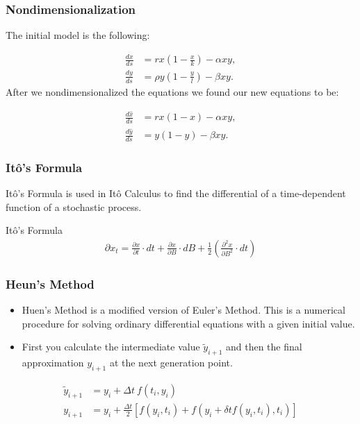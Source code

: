

\begin{frame}
\frametitle{Nondimensionalization}

The initial model is the following:

  \begin{align*}
    \frac{dx}{ds} & = rx \left(1-\frac{x}{k}\right) - \alpha xy, \\
    \frac{dy}{ds} & = \rho y \left(1-\frac{y}{l}\right) - \beta xy.
  \end{align*}
After we nondimensionalized the equations we found our new equations to be:

	\begin{align*}
		\frac{d\hat{x}}{ds} &= rx(1-x) - \alpha xy, \\
		\frac{d\hat{y}}{ds} &= y(1-y) - \beta xy.
	\end{align*}
\end{frame}



\begin{frame}
\frametitle{It\^o's Formula}
It\^o's Formula is used in It\^o Calculus to find the differential of a time-dependent function of a stochastic process.

		 \begin{block}{It\^o's Formula}
      \begin{align*}
				\partial x_t = \frac{\partial x}{\partial t} \cdot dt + \frac{\partial x}{\partial B} \cdot dB + \frac{1}{2} \left(\frac{\partial ^2 x}{\partial B ^2} \cdot dt\right)
			\end{align*}
    \end{block}
		
\end{frame}

\begin{frame}
\frametitle{Heun's Method}
\begin{itemize}
\item Huen's Method is a modified version of Euler's Method. This is a numerical procedure for solving ordinary differential equations with a given initial value.
\item First you calculate the intermediate value $\tilde{y}_{i+1}$ and then the final approximation $y_{i+1}$ at the next generation point.
\end{itemize}

\begin{align*}
	\tilde{y}_{i+1} &= y_i + \Delta t \ f(t_i, y_i) \\
	y_{i+1} &= y_i + \frac{\Delta t}{2} \left[f(y_i,t_i) + f(y_i +\delta t f(y_i,t_i), t_i)\right]
\end{align*}
\end{frame}